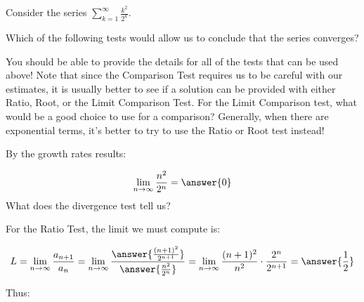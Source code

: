 \documentclass{ximera}
\author{Jim Talamo}
\begin{document}
\begin{exercise}

Consider the series $\sum_{k=1}^{\infty} \frac{k^2}{2^k}$.  

\begin{multipleChoice}

Which of the following tests would allow us to conclude that the series converges?
\end{multipleChoice}
\begin{selectAll}
\end{selectAll}

\begin{hint}
You should be able to provide the details for all of the tests that can be used above!  Note that since the Comparison Test requires us to be careful with our estimates, it is usually better to see if a solution can be provided with either Ratio, Root, or the Limit Comparison Test.  For the Limit Comparison test, what would be a good choice to use for a comparison?  Generally, when there are exponential terms, it's better to try to use the Ratio or Root test instead!

\begin{question}
By the growth rates results:

\[
\lim_{n \to \infty} \frac{n^2}{2^n} = \answer{0}
\]
What does the divergence test tell us?

\end{question}

\begin{question}
For the Ratio Test, the limit we must compute is:

\[
L = \lim_{n \to \infty} \frac{a_{n+1}}{a_n} =\lim_{n \to \infty}  \frac{\answer{\frac{(n+1)^2}{2^{n+1}}}}{\answer{\frac{n^2}{2^n}}} = \lim_{n \to \infty}  \frac{(n+1)^2}{n^2} \cdot \frac{2^n}{2^{n+1}} = \answer{\frac{1}{2}}
\]

Thus:

\begin{multipleChoice}
\end{multipleChoice}
\end{question}


\end{hint}
\end{exercise}
\end{document}
